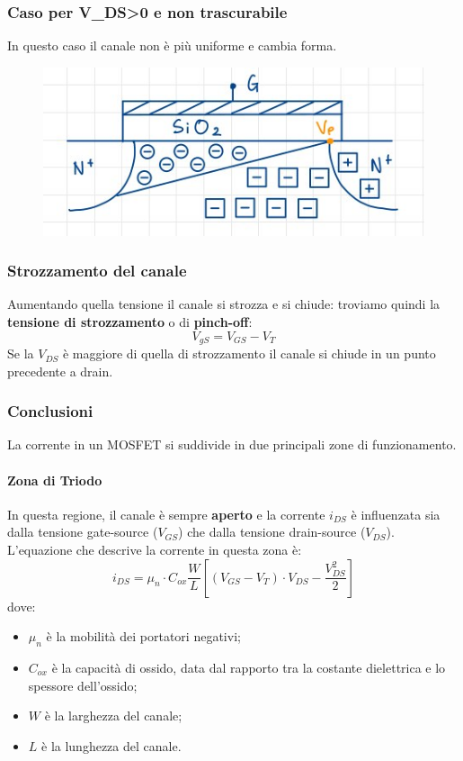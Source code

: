 \documentclass[11pt,a4paper,]{article}
\begin{document}
\subsubsection{Caso per V\_DS>0 e non trascurabile}
In questo caso il canale non è più uniforme e cambia forma.
\begin{figure}[H]
    \centering
    \includegraphics[width=0.25\linewidth]{img/cambio forma.png}
\end{figure}
\subsubsection{Strozzamento del canale}
Aumentando quella tensione il canale si strozza e si chiude: troviamo quindi la \textbf{tensione di strozzamento} o di \textbf{pinch-off}:
\[
V_{gS} = V_{GS} -V_T
\]
Se la $V_{DS}$ è maggiore di quella di strozzamento il canale si chiude in un punto precedente a drain.

\subsubsection{Conclusioni}

La corrente in un MOSFET si suddivide in due principali zone di funzionamento.

\paragraph{Zona di Triodo}

In questa regione, il canale è sempre \textbf{aperto} e la corrente $i_{DS}$ è influenzata sia dalla tensione gate-source ($V_{GS}$) che dalla tensione drain-source ($V_{DS}$). L'equazione che descrive la corrente in questa zona è:
$$i_{DS} = \mu_n \cdot C_{ox} \frac{W}{L} \left[ (V_{GS} - V_T) \cdot V_{DS} - \frac{V_{DS}^2}{2} \right]$$
\noindent dove:
\begin{itemize}
    \item $\mu_n$ è la mobilità dei portatori negativi;
    \item $C_{ox}$ è la capacità di ossido, data dal rapporto tra la costante dielettrica e lo spessore dell'ossido;
    \item $W$ è la larghezza del canale;
    \item $L$ è la lunghezza del canale.
\end{itemize}
\end{document}
